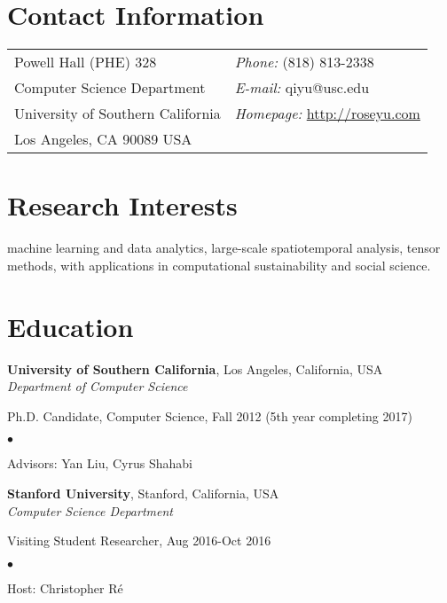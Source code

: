 \documentclass[margin,line]{res}
\newenvironment{list1}{
  \begin{list}{\ding{113}}{%
      \setlength{\itemsep}{0in}
      \setlength{\parsep}{0in} \setlength{\parskip}{0in}
      \setlength{\topsep}{0in} \setlength{\partopsep}{0in} 
      \setlength{\leftmargin}{0.17in}}}{\end{list}}
\newenvironment{list2}{
  \begin{list}{$\bullet$}{%
      \setlength{\itemsep}{0in}
      \setlength{\parsep}{0in} \setlength{\parskip}{0in}
      \setlength{\topsep}{0in} \setlength{\partopsep}{0in} 
      \setlength{\leftmargin}{0.2in}}}{\end{list}}
\begin{document}

\begin{resume}
\section{\sc Contact Information}
\vspace{.05in}
\begin{tabular}{@{}p{2in}p{4in}}
Powell Hall (PHE) 328 & {\it Phone:}  (818) 813-2338 \\            
Computer Science Department  & {\it E-mail:}  qiyu@usc.edu  \\         
University of Southern California & {\it Homepage:} \url{http://roseyu.com} \\       
Los Angeles, CA 90089 USA  & \\     
\end{tabular}


\section{\sc Research Interests}
machine learning and data analytics, large-scale spatiotemporal analysis, tensor methods, with applications in computational sustainability and social science.

\section{\sc Education}
{\bf University of Southern California}, Los Angeles, California, USA\\
{\em Department of Computer Science} 
\begin{list1}
\item[] Ph.D. Candidate, Computer Science,  Fall 2012 (5th year completing  2017) 
\begin{list2}
\vspace*{.05in}
\item Advisors:  Yan Liu, Cyrus Shahabi
\end{list2}


\vspace*{.05in}
\end{list1}
{\bf Stanford University}, Stanford, California, USA\\
{\em Computer Science Department } 
\begin{list1}
	\item[] Visiting Student Researcher,  Aug 2016-Oct 2016
	\begin{list2}
		\vspace*{.05in}
		\item Host:  Christopher R\'e
	\end{list2}
\end{list1}


\end{resume}
\end{document}
